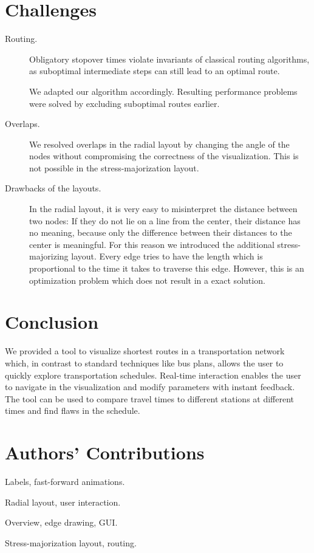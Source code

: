 \documentclass[a4paper, twocolumn,
final
]{article}
\begin{document}
\section*{Challenges}

\begin{description}
\item[Routing.] Obligatory stopover times violate invariants of classical routing algorithms, as
  suboptimal intermediate steps can still lead to an optimal route.
  
  We adapted our algorithm accordingly.
  Resulting performance problems were solved by excluding suboptimal routes earlier.
\item[Overlaps.] We resolved overlaps in the radial layout by changing the angle of the nodes without
compromising the correctness of the visualization. This is not possible in the stress-majorization layout.
\item[Drawbacks of the layouts.] In the radial layout, it is very easy to misinterpret the distance
between two nodes: If they do not lie on a line from the center, their distance has no meaning,
because only the difference between their distances to the center is meaningful. For this reason we
introduced the additional stress-majorizing layout. Every edge tries to have the length which is
proportional to the time it takes to traverse this edge. However, this is an optimization problem
which does not result in a exact solution. 
\end{description}

\section*{Conclusion}

We provided a tool to visualize shortest routes in a transportation network which, in contrast to
standard techniques like bus plans, allows the user to quickly explore transportation schedules.
Real-time interaction enables the user to navigate in the visualization and modify parameters
with instant feedback. The tool can be used to compare travel times to different stations at
different times and find flaws in the schedule.

\section*{Authors' Contributions}

\begin{description}
\setlength{\itemsep}{0pt}
  \item[Feeras Al-Masoudi] Labels, fast-forward animations.
  \item[Josua Krause] Radial layout, user interaction.
  \item[Marc Spicker] Overview, edge drawing, GUI.
  \item[Leonard Wörteler] Stress-majorization layout, routing.
\end{description}
\end{document}
